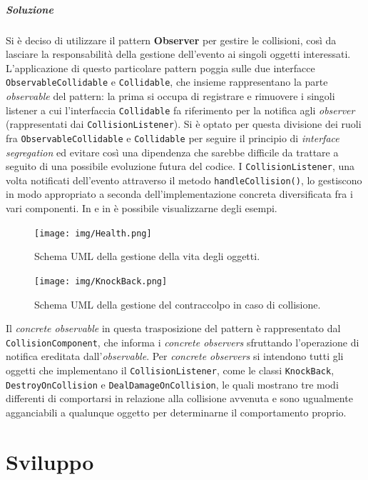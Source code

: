 \documentclass[a4paper,12pt]{report}
\begin{document}
\paragraph*{Soluzione}
Si è deciso di utilizzare il pattern \textbf{Observer} per gestire le collisioni, così da lasciare la responsabilità della gestione dell'evento ai singoli oggetti interessati.
%
L'applicazione di questo particolare pattern poggia sulle due interfacce \texttt{ObservableCollidable} e \texttt{Collidable}, che insieme rappresentano la parte \textit{observable} del pattern: la prima si occupa di registrare e rimuovere i singoli listener a cui l'interfaccia \texttt{Collidable} fa riferimento per la notifica agli \textit{observer} (rappresentati dai \texttt{CollisionListener}).
Si è optato per questa divisione dei ruoli fra \texttt{ObservableCollidable} e \texttt{Collidable} per seguire il principio di \textit{interface segregation} ed evitare così una dipendenza che sarebbe difficile da trattare a seguito di una possibile evoluzione futura del codice. 
I \texttt{CollisionListener}, una volta notificati dell'evento attraverso il metodo \texttt{handleCollision()}, lo gestiscono in modo appropriato a seconda dell'implementazione concreta diversificata fra i vari componenti.
In  e in  è possibile visualizzarne degli esempi.
%
\begin{figure}[H]
    \centering{}
    \texttt{[image: img/Health.png]}
    \caption{Schema UML della gestione della vita degli oggetti.}
    \label{fig:health}
\end{figure}
%
\begin{figure}[H]
    \centering{}
    \texttt{[image: img/KnockBack.png]}
    \caption{Schema UML della gestione del contraccolpo in caso di collisione.}
    \label{fig:knock-back}
\end{figure}
%
Il \textit{concrete observable} in questa trasposizione del pattern è rappresentato dal \texttt{CollisionComponent}, che informa i \textit{concrete observers} sfruttando l'operazione di notifica ereditata dall'\textit{observable}.
Per \textit{concrete observers} si intendono tutti gli oggetti che implementano il \texttt{CollisionListener}, come le classi \texttt{KnockBack}, \texttt{DestroyOnCollision} e \texttt{DealDamageOnCollision}, le quali mostrano tre modi differenti di comportarsi in relazione alla collisione avvenuta e sono ugualmente agganciabili a qualunque oggetto per determinarne il comportamento proprio.
%
\chapter{Sviluppo}
\end{document}
